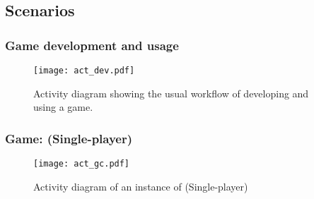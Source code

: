 \subsection{Scenarios}

\subsubsection{Game development and usage}
\begin{figure}[h!]
	\centering
	\texttt{[image: act\_dev.pdf]}
	\caption{Activity diagram showing the usual workflow of developing and using a game.}
	\label{img:ACTDEV}
\end{figure}
\pagebreak
\subsubsection{Game: \graphcoloring (Single-player)}
\begin{figure}[h!]
	\centering
	\texttt{[image: act\_gc.pdf]}
	\caption{Activity diagram of an instance of \graphcoloring (Single-player)}
	\label{img:ACTGC}
\end{figure}